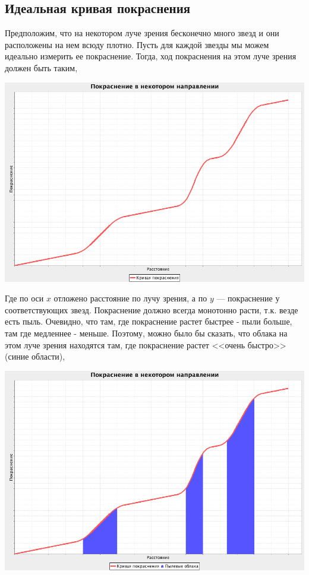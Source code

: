 \documentclass[14pt]{article}
\begin{document}
        \subsection{Идеальная кривая покраснения}
            Предположим, что на некотором луче зрения бесконечно много звезд и они расположены на нем всюду плотно. Пусть для каждой звезды мы можем идеально измерить ее покраснение. Тогда, ход покраснения на этом луче зрения должен быть таким,
        		
        		\begin{center}
        			\includegraphics[scale=0.3]{../../presentation/ideal-1-no-tick.png}
			\end{center}        		
        		
        		Где по оси $x$ отложено расстояние по лучу зрения, а по $y$ --- покраснение у соответствующих звезд. Покраснение должно всегда монотонно расти, т.к. везде есть пыль.  Очевидно, что там, где покраснение растет быстрее - пыли больше, там где медленнее - меньше. Поэтому, можно было бы сказать, что облака на этом луче зрения находятся там, где покраснение растет <<очень быстро>> (синие области),   
           
            \begin{center}
           		\includegraphics[scale=0.3]{../../presentation/ideal-2-no-tick.png}    
			\end{center}        
        
\end{document}
